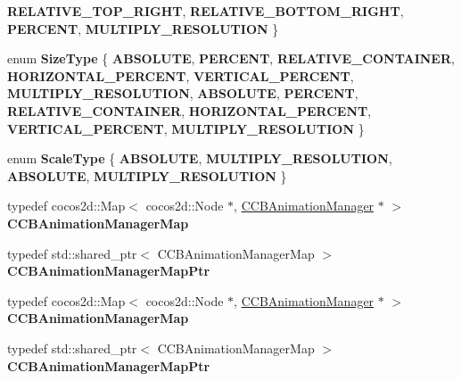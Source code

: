 \begin{DoxyCompactItemize}
\newline
{\bfseries R\+E\+L\+A\+T\+I\+V\+E\+\_\+\+T\+O\+P\+\_\+\+R\+I\+G\+HT}, 
{\bfseries R\+E\+L\+A\+T\+I\+V\+E\+\_\+\+B\+O\+T\+T\+O\+M\+\_\+\+R\+I\+G\+HT}, 
{\bfseries P\+E\+R\+C\+E\+NT}, 
{\bfseries M\+U\+L\+T\+I\+P\+L\+Y\+\_\+\+R\+E\+S\+O\+L\+U\+T\+I\+ON}
 \}
\item 
\mbox{\label{classcocosbuilder_1_1CCBReader_a4e1876d76c39cbbea7cfa0bb458ea134}} 
enum {\bfseries Size\+Type} \{ \newline
{\bfseries A\+B\+S\+O\+L\+U\+TE}, 
{\bfseries P\+E\+R\+C\+E\+NT}, 
{\bfseries R\+E\+L\+A\+T\+I\+V\+E\+\_\+\+C\+O\+N\+T\+A\+I\+N\+ER}, 
{\bfseries H\+O\+R\+I\+Z\+O\+N\+T\+A\+L\+\_\+\+P\+E\+R\+C\+E\+NT}, 
\newline
{\bfseries V\+E\+R\+T\+I\+C\+A\+L\+\_\+\+P\+E\+R\+C\+E\+NT}, 
{\bfseries M\+U\+L\+T\+I\+P\+L\+Y\+\_\+\+R\+E\+S\+O\+L\+U\+T\+I\+ON}, 
{\bfseries A\+B\+S\+O\+L\+U\+TE}, 
{\bfseries P\+E\+R\+C\+E\+NT}, 
\newline
{\bfseries R\+E\+L\+A\+T\+I\+V\+E\+\_\+\+C\+O\+N\+T\+A\+I\+N\+ER}, 
{\bfseries H\+O\+R\+I\+Z\+O\+N\+T\+A\+L\+\_\+\+P\+E\+R\+C\+E\+NT}, 
{\bfseries V\+E\+R\+T\+I\+C\+A\+L\+\_\+\+P\+E\+R\+C\+E\+NT}, 
{\bfseries M\+U\+L\+T\+I\+P\+L\+Y\+\_\+\+R\+E\+S\+O\+L\+U\+T\+I\+ON}
 \}
\item 
\mbox{\label{classcocosbuilder_1_1CCBReader_ae42241bc73eb3fab6b9b9767f68e6c68}} 
enum {\bfseries Scale\+Type} \{ {\bfseries A\+B\+S\+O\+L\+U\+TE}, 
{\bfseries M\+U\+L\+T\+I\+P\+L\+Y\+\_\+\+R\+E\+S\+O\+L\+U\+T\+I\+ON}, 
{\bfseries A\+B\+S\+O\+L\+U\+TE}, 
{\bfseries M\+U\+L\+T\+I\+P\+L\+Y\+\_\+\+R\+E\+S\+O\+L\+U\+T\+I\+ON}
 \}
\item 
\mbox{\label{classcocosbuilder_1_1CCBReader_aa34059b8e76ec09d974dddd133b7e341}} 
typedef cocos2d\+::\+Map$<$ cocos2d\+::\+Node $\ast$, \hyperlink{classcocosbuilder_1_1CCBAnimationManager}{C\+C\+B\+Animation\+Manager} $\ast$ $>$ {\bfseries C\+C\+B\+Animation\+Manager\+Map}
\item 
\mbox{\label{classcocosbuilder_1_1CCBReader_a5752c46b9e44214f1a591eff457114f5}} 
typedef std\+::shared\+\_\+ptr$<$ C\+C\+B\+Animation\+Manager\+Map $>$ {\bfseries C\+C\+B\+Animation\+Manager\+Map\+Ptr}
\item 
\mbox{\label{classcocosbuilder_1_1CCBReader_aa34059b8e76ec09d974dddd133b7e341}} 
typedef cocos2d\+::\+Map$<$ cocos2d\+::\+Node $\ast$, \hyperlink{classcocosbuilder_1_1CCBAnimationManager}{C\+C\+B\+Animation\+Manager} $\ast$ $>$ {\bfseries C\+C\+B\+Animation\+Manager\+Map}
\item 
\mbox{\label{classcocosbuilder_1_1CCBReader_a5752c46b9e44214f1a591eff457114f5}} 
typedef std\+::shared\+\_\+ptr$<$ C\+C\+B\+Animation\+Manager\+Map $>$ {\bfseries C\+C\+B\+Animation\+Manager\+Map\+Ptr}
\end{DoxyCompactItemize}
